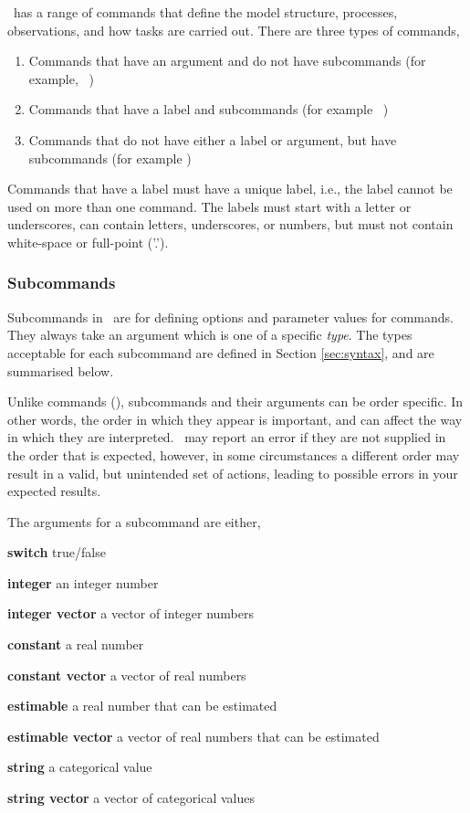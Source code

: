 \SPM\ has a range of commands that define the model structure, processes, observations, and how tasks are carried out. There are three types of commands, 

\begin{enumerate}
\item Commands that have an argument and do not have subcommands (for example, \ )
\item Commands that have a label and subcommands (for example \ )
\item Commands that do not have either a label or argument, but have subcommands (for example )
\end{enumerate}

Commands that have a label must have a unique label, i.e., the label cannot be used on more than one command. The labels must start with a letter or underscores, can contain letters, underscores, or numbers, but must not contain white-space or full-point ('.').

\subsubsection{Subcommands}

Subcommands in \SPM\ are for defining options and parameter values for commands. They always take an argument which is one of a specific \emph{type}. The types acceptable for each subcommand are defined in Section \ref{sec:syntax}, and are summarised below. 

Unlike commands (), subcommands and their arguments can be order specific. In other words, the order in which they appear is important, and can affect the way in which they are interpreted. \SPM\ may report an error if they are not supplied in the order that is expected, however, in some circumstances a different order may result in a valid, but unintended set of actions, leading to possible errors in your expected results.  

The arguments for a subcommand are either,

\begin{description}
\item \textbf{switch} true/false 
\item \textbf{integer} an integer number
\item \textbf{integer vector} a vector of integer numbers
\item \textbf{constant} a real number 
\item \textbf{constant vector} a vector of real numbers
\item \textbf{estimable} a real number that can be estimated
\item \textbf{estimable vector} a vector of real numbers that can be estimated
\item \textbf{string} a categorical value
\item \textbf{string vector} a vector of categorical values
\end{description}


